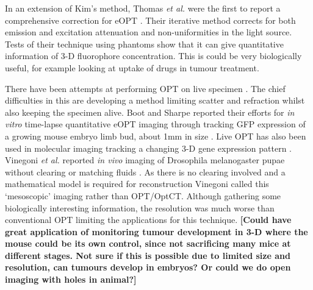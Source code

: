 \documentclass[12pt]{article}
\begin{document}
In an extension of Kim's method, Thomas \textit{et al.} were the first to report a comprehensive correction for  eOPT \cite{Thomas:2010gt}. Their iterative method corrects for both emission and excitation attenuation and non-uniformities in the light source. 
Tests of their technique using phantoms show that it can give quantitative information of 3-D fluorophore concentration. This is could be very biologically useful, for example looking at uptake of drugs in tumour treatment. 

  




There have been attempts at performing OPT  on live specimen \cite{Boot:2008dt, Vinegoni:2008ix, Colas:2009}. The chief difficulties in this are developing a method limiting scatter and refraction  whilst also keeping the specimen alive. Boot and Sharpe reported their efforts for \textit{in vitro} time-lapse quantitative eOPT  imaging through tracking GFP expression of a growing mouse embryo limb bud, about 1mm in size \cite{Boot:2008dt}. 
Live OPT has also been used in molecular imaging tracking a changing 3-D gene expression pattern \cite{Colas:2009}.
Vinegoni \textit{et al.} reported \textit{in vivo} imaging of Drosophila melanogaster pupae without clearing or matching fluids \cite{Vinegoni:2008ix}.  As there is no clearing involved and a mathematical model is required for reconstruction Vinegoni called this `mesoscopic' imaging rather than OPT/OptCT.  
Although gathering some biologically interesting information, the resolution was much worse than conventional OPT limiting the applications for this technique. \textbf{[Could have great application of monitoring tumour development in 3-D where the mouse could be its own control, since not sacrificing many mice at different stages. Not sure if this is possible due to limited size and resolution, can tumours develop in embryos? Or could we do open imaging with holes in animal?]}




\end{document}
